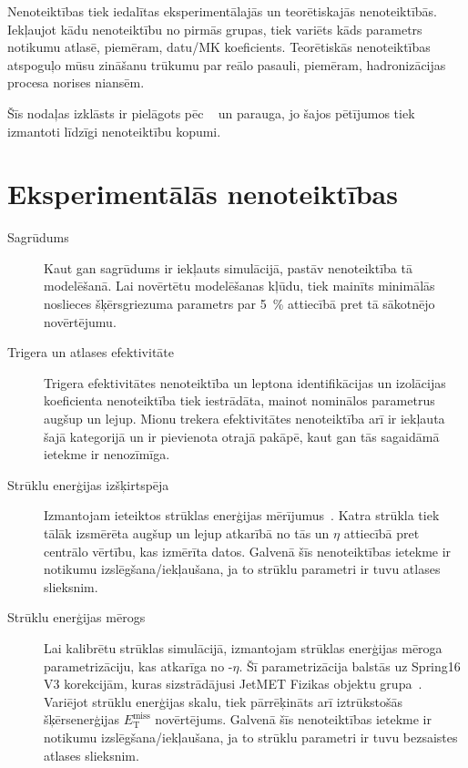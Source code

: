 Nenoteiktības tiek iedalītas eksperimentālajās un teorētiskajās nenoteiktībās. Iekļaujot kādu nenoteiktību no pirmās grupas, tiek variēts kāds parametrs notikumu atlasē, piemēram, datu/MK koeficients. Teorētiskās nenoteiktības atspoguļo mūsu zināšanu trūkumu par reālo pasauli, piemēram, hadronizācijas procesa norises niansēm. 

Šīs nodaļas izklāsts ir pielāgots pēc ~\cite{CMS-AN-2017-175} un \cite{CMS-AN-2017-159} parauga, jo šajos pētījumos tiek izmantoti līdzīgi nenoteiktību kopumi.

\section{Eksperimentālās nenoteiktības}
\begin{description}
\item[Sagrūdums] Kaut gan sagrūdums ir iekļauts simulācijā, pastāv nenoteiktība tā modelēšanā. Lai novērtētu modelēšanas kļūdu, tiek mainīts minimālās noslieces šķērsgriezuma parametrs par 5~\% attiecībā pret tā sākotnējo novērtējumu. 

\item[Trigera un atlases efektivitāte] Trigera efektivitātes nenoteiktība un leptona identifikācijas un izolācijas koeficienta nenoteiktība tiek iestrādāta, mainot nominālos parametrus augšup un lejup. Mionu trekera efektivitātes nenoteiktība arī ir iekļauta šajā kategorijā un ir pievienota otrajā pakāpē, kaut gan tās sagaidāmā ietekme ir nenozīmīga. 

\item[Strūklu enerģijas izšķirtspēja] Izmantojam ieteiktos strūklas enerģijas mērījumus~\cite{twiki:JER}. Katra strūkla tiek tālāk izsmērēta augšup un lejup atkarībā no tās \pt un $\eta$ attiecībā pret centrālo vērtību, kas izmērīta datos. Galvenā šīs nenoteiktības ietekme ir notikumu izslēgšana/iekļaušana, ja to strūklu parametri ir tuvu atlases slieksnim. 

\item[Strūklu enerģijas mērogs] Lai kalibrētu strūklas simulācijā, izmantojam strūklas enerģijas mēroga parametrizāciju, kas atkarīga no \pt-$\eta$. Šī parametrizācija balstās uz Spring16 V3 korekcijām, kuras sizstrādājusi JetMET Fizikas objektu grupa~\cite{twiki:JES}. Variējot strūklu enerģijas skalu, tiek pārrēķināts arī iztrūkstošās šķērsenerģijas $E^{\text{miss}}_{\text{T}}$ novērtējums. Galvenā šīs nenoteiktības ietekme ir notikumu izslēgšana/iekļaušana, ja to strūklu parametri ir tuvu bezsaistes atlases slieksnim. 


\end{description}
